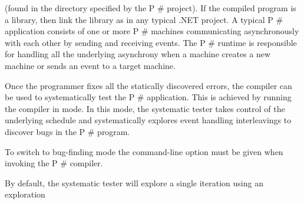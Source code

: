 \documentclass{article}
\begin{document}
\begin{mdDiv}[class={body,madoko},elem={body},line-adjust={0}]
\begin{mdP}[data-line={741}]
{}
(found in the directory specified by the P%
{}\#%
{} project). If the compiled program is a library,
then link the library as in any typical .NET project.
A typical P%
{}\#%
{} application consists of one or more P%
{}\#%
{} machines communicating asynchronously
with each other by sending and receiving events. The P%
{}\#%
{} runtime is responsible for handling
all the underlying asynchrony when a machine creates a new machine or sends an event to a
target machine.%
\end{mdP}%
\begin{mdP}[data-line={751}]%
{}Once the programmer fixes all the statically discovered errors, the compiler can be used
to systematically test the P%
{}\#%
{} application. This is achieved by running the compiler in
{}%
{} mode. In this mode, the systematic tester takes control of the underlying
schedule and systematically explores event handling interleavings to discover bugs in the
P%
{}\#%
{} program.%
\end{mdP}%
\begin{mdP}[class={indent},data-line={757}]%
{}To switch to bug-finding mode the command-line option %
{}%
{} must be given when invoking
the P%
{}\#%
{} compiler.%
\end{mdP}%
\begin{mdP}[class={indent},data-line={760}]%
{}By default, the systematic tester will explore a single iteration using an exploration

\end{mdP}
\end{mdDiv}
\end{document}
